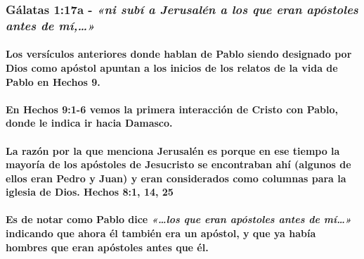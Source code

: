 \documentclass[11a pt,twoside]{article}
\newcommand{\scripture}[1]{%
  {\fontsize{12pt}{16pt}\selectfont\ScriptureFont\itshape #1}%
}
\let\oldsubsubsection\subsubsection
\renewcommand{\subsubsection}{\needspace{4\baselineskip}\oldsubsubsection}
\let\oldparagraph\paragraph
\renewcommand{\paragraph}{\needspace{3\baselineskip}\oldparagraph}
\begin{document}
\subsubsection{\texorpdfstring{Gálatas 1:17a -
\scripture{«ni subí a Jerusalén a los que eran apóstoles antes de mí,…»}}{Gálatas 1:17a - }}\label{guxe1latas-117a---ni-subuxed-a-jerusaluxe9n-a-los-que-eran-apuxf3stoles-antes-de-muxed}

\paragraph{Los versículos anteriores donde hablan de Pablo siendo
designado por Dios como apóstol apuntan a los inicios de los relatos de
la vida de Pablo en Hechos
9.}\label{los-versuxedculos-anteriores-donde-hablan-de-pablo-siendo-designado-por-dios-como-apuxf3stol-apuntan-a-los-inicios-de-los-relatos-de-la-vida-de-pablo-en-hechos-9.}

\paragraph{En Hechos 9:1-6 vemos la primera interacción de Cristo con
Pablo, donde le indica ir hacia
Damasco.}\label{en-hechos-91-6-vemos-la-primera-interacciuxf3n-de-cristo-con-pablo-donde-le-indica-ir-hacia-damasco.}

\paragraph{La razón por la que menciona Jerusalén es porque en ese
tiempo la mayoría de los apóstoles de Jesucristo se encontraban ahí
(algunos de ellos eran Pedro y Juan) y eran considerados como columnas
para la iglesia de Dios. Hechos 8:1, 14,
25}\label{la-razuxf3n-por-la-que-menciona-jerusaluxe9n-es-porque-en-ese-tiempo-la-mayoruxeda-de-los-apuxf3stoles-de-jesucristo-se-encontraban-ahuxed-algunos-de-ellos-eran-pedro-y-juan-y-eran-considerados-como-columnas-para-la-iglesia-de-dios.-hechos-81-14-25}

\paragraph{\texorpdfstring{Es de notar como Pablo dice
\scripture{«…los que eran apóstoles antes de mí…»} indicando que ahora
él también era un apóstol, y que ya había hombres que eran apóstoles
antes que
él.}{Es de notar como Pablo dice  indicando que ahora él también era un apóstol, y que ya había hombres que eran apóstoles antes que él.}}\label{es-de-notar-como-pablo-dice-los-que-eran-apuxf3stoles-antes-de-muxed-indicando-que-ahora-uxe9l-tambiuxe9n-era-un-apuxf3stol-y-que-ya-habuxeda-hombres-que-eran-apuxf3stoles-antes-que-uxe9l.}
\end{document}
